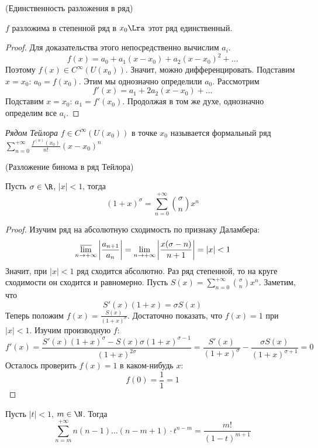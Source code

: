\begin{theorem}(Единственность разложения в ряд)

    $f$ разложима в степенной ряд в $x_0 \Lra$ этот ряд единственный.
\end{theorem}
\begin{proof}
    Для доказательства этого непосредственно вычислим $a_i$.
\[
    f(x) = a_0 + a_1 (x - x_0) + a_2 (x - x_0)^2 + \ldots
\]
    Поэтому $f(x) \in C^{\infty}(U(x_0))$. Значит, можно дифференцировать.
    Подставим $x = x_0$: $a_0 = f(x_0)$. Этим мы однозначно определили $a_0$.
    Рассмотрим
\[
    f'(x) = a_1 + 2a_2 (x - x_0) + \ldots
\]
    Подставим $x = x_0$:
    $a_1 = f'(x_0)$. Продолжая в том же духе, однозначно определим все $a_i$.
\end{proof}

\begin{definition}
    \textit{Рядом Тейлора} $f \in C^{\infty}(U(x_0))$ в точке $x_0$
    называется формальный ряд $\displaystyle
    \sum_{n = 0}^{+\infty}{\frac{f^{(n)}(x_0)}{n!}(x - x_0)^n}$
\end{definition}

\begin{theorem}(Разложение бинома в ряд Тейлора)

    Пусть $\sigma \in \R$, $|x| < 1$, тогда
\[
    (1 + x)^{\sigma} = \sum_{n = 0}^{+\infty}{\binom{\sigma}{n}x^n}
\]
\end{theorem}
\begin{proof}
    Изучим ряд на абсолютную сходимость по признаку Даламбера:
\[
    \varlimsup_{n \to +\infty}{\left|\frac{a_{n + 1}}{a_n}\right|}
    = \lim_{n \to +\infty}{\left|\frac{x(\sigma - n)}{n + 1}\right|} = |x| < 1
\]
    Значит, при $|x| < 1$ ряд сходится абсолютно. Раз ряд степенной, то
    на круге сходимости он сходится и равномерно. Пусть
    $\displaystyle S(x) = \sum_{n = 0}^{+\infty}{\binom{\sigma}{n}x^n}$.
    Заметим, что
\[
    S'(x)(1 + x) = \sigma S(x)
\]
    Теперь положим $\displaystyle f(x) = \frac{S(x)}{(1 + x)^\sigma}$.
    Достаточно показать, что $f(x) = 1$ при $|x| < 1$. Изучим производную $f$:
\[
    f'(x) = \frac{S'(x)(1 + x)^\sigma - S(x)\sigma(1 + x)^{\sigma - 1}}
    {(1 + x)^{2\sigma}} = \frac{S'(x)}{(1 + x)^\sigma}
    - \frac{\sigma S(x)}{(1 + x)^{\sigma + 1}} = 0
\]
    Осталось проверить $f(x) = 1$ в каком-нибудь $x$:
\[
    f(0) = \frac{1}{1} = 1
\]
\end{proof}

\begin{remark}
    Пусть $|t| < 1$, $m \in \N$. Тогда
\[
    \sum_{n = m}^{+\infty}{n(n - 1)\ldots(n - m + 1)\cdot t^{n - m}}
    = \frac{m!}{(1 - t)^{m + 1}}
\]
\end{remark}

